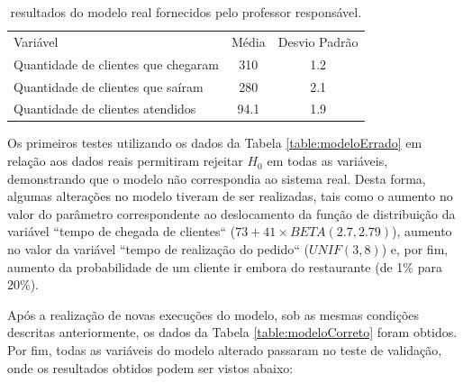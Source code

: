 \documentclass[pt,disc,oneside]{ufscpgeasthesis}
\begin{document}
			\begin{table}[!ht]
				\centering
				\begin{tabular}{l|c|c}
					\rowcolor{gray!70} Variável 						   & Média   & Desvio Padrão \\
					\rowcolor{gray!20} Quantidade de clientes que chegaram & 310  	 & 1.2 			 \\
					\rowcolor{gray!40} Quantidade de clientes que saíram   & 280  	 & 2.1 			 \\
					\rowcolor{gray!20} Quantidade de clientes atendidos    & 94.1 	 & 1.9
				\end{tabular}
				\caption{resultados do modelo real fornecidos pelo professor responsável.}
				\label{table:modeloReal}
			\end{table}

			Os primeiros testes utilizando os dados da Tabela \ref{table:modeloErrado} em relação aos dados reais permitiram rejeitar $H_0$ em todas as variáveis, demonstrando que o modelo não correspondia ao sistema real.
			Desta forma, algumas alterações no modelo tiveram de ser realizadas, tais como o aumento no valor do parâmetro correspondente ao deslocamento da função de distribuição da variável ``tempo de chegada de clientes`` ($73 + 41 \times BETA(2.7, 2.79)$), aumento no valor da variável ``tempo de realização do pedido`` ($UNIF(3, 8)$) e, por fim, aumento da probabilidade de um cliente ir embora do restaurante (de 1\% para 20\%).

			Após a realização de novas execuções do modelo, sob as mesmas condições descritas anteriormente, os dados da Tabela \ref{table:modeloCorreto} foram obtidos.
			Por fim, todas as variáveis do modelo alterado passaram no teste de validação, onde os resultados obtidos podem ser vistos abaixo:
\end{document}
